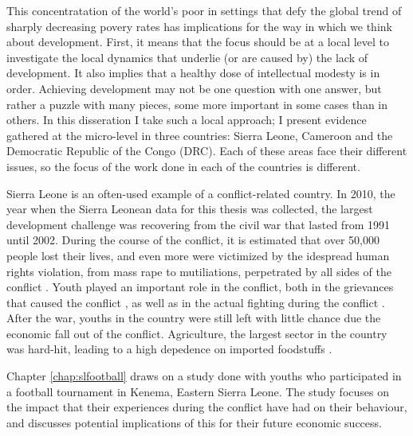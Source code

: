 This concentratation of the world's poor in settings that defy the global trend of sharply decreasing povery rates has implications for the way in which we think about development. First, it means that the focus should be at a local level to investigate the local dynamics that underlie (or are caused by) the lack of development. It also implies that a healthy dose of intellectual modesty is in order. Achieving development may not be one question with one answer, but rather a puzzle with many pieces, some more important in some cases than in others. In this disseration I take such a local approach; I  present evidence gathered at the micro-level in three countries: Sierra Leone, Cameroon and the Democratic Republic of the Congo (DRC). Each of these areas face their different issues, so the focus of the work done in each of the countries is different.

Sierra Leone is an often-used example of a conflict-related country. In 2010, the year when the Sierra Leonean data for this thesis was collected, the largest development challenge was recovering from the civil war that lasted from 1991 until 2002. During the course of the conflict, it is estimated that over 50,000 people lost their lives, and even more were victimized by the idespread human rights violation, from mass rape to mutiliations, perpetrated by all sides of the conflict \citep{HumanRightsWatch1999a}. Youth played an important role in the conflict, both in the grievances that caused the conflict \citep[see e.g.][]{Peters1998,Richards2005,Peters2011}, as well as in the actual fighting during the conflict \citep{Humphreys2013}. After the war, youths in the country were still left with little chance due the economic fall out of the conflict.  Agriculture, the largest sector in the country was hard-hit, leading to a high depedence on imported foodstuffs \citep{FAO2005}. 

Chapter \ref{chap:slfootball} draws on a study done with youths who participated in a football tournament in Kenema, Eastern Sierra Leone. The study focuses on the impact that their experiences during the conflict have had on their behaviour, and discusses potential implications of this for their future economic success. 

